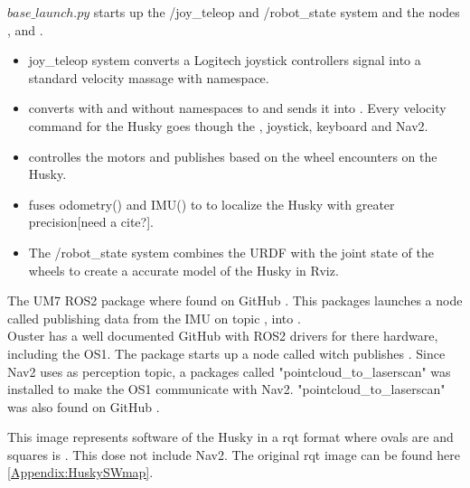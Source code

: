 $base\_launch.py$ starts up the /joy\_teleop and /robot\_state system and the nodes ,  and . 

\begin{itemize}
    \item joy\_teleop system converts a Logitech joystick controllers signal into  a standard velocity massage with namespace. 
    
    \item {} converts  with and without namespaces to  and sends it into . Every velocity command for the Husky goes though the , joystick, keyboard and Nav2. 
    
    \item {} controlles the motors and publishes  based on the wheel encounters on the Husky. 
    
    \item {} fuses odometry() and IMU() to  to localize the Husky with greater precision[need a cite?]. 
    
    \item The /robot\_state system combines the URDF with the joint state of the wheels to create a accurate model of the Husky in Rviz. 
    
\end{itemize}

The UM7 ROS2 package where found on GitHub \cite{um7imu}. This packages launches a node called  publishing data from the IMU on topic , into .
\\ \newline
Ouster has a well documented GitHub \cite{ousterros} with ROS2 drivers for there hardware, including the OS1. The package starts up a node called  witch publishes . 
Since Nav2 uses  as perception topic, a packages called "pointcloud\_to\_laserscan" \cite{pcl2laser} was installed to make the OS1 communicate with Nav2. "pointcloud\_to\_laserscan" was also found on GitHub . 

This image represents software of the Husky in a rqt format where 
ovals are  and squares is . This dose not include Nav2. The original rqt image can be found here \ref{Appendix:HuskySWmap}. 

